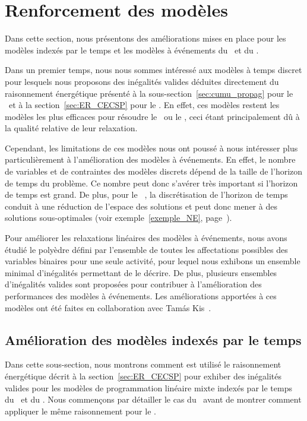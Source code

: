 \section{Renforcement des modèles}
\label{sec:amelioration_modele}
Dans cette section, nous présentons des améliorations mises en place
pour les modèles indexés par le temps et les modèles à événements du
\RCPSP~et du \CECSP. 

Dans un premier temps, nous nous sommes intéressé aux modèles à temps
discret pour lesquels nous proposons des inégalités valides déduites
directement du raisonnement énergétique présenté à la
sous-section~\ref{sec:cumu_propag} pour le \CUSP~et à la
section~\ref{sec:ER_CECSP} pour le \CECSP. En effet, ces modèles
restent les modèles les plus efficaces pour résoudre le \CECSP~ou le
\RCPSP, ceci étant principalement dû à la qualité relative de leur
relaxation.

Cependant, les limitations de ces modèles nous ont poussé à nous
intéresser plus particulièrement à l'amélioration des modèles à
événements. En effet, le nombre de variables et de contraintes des
modèles discrets dépend de la taille de l'horizon de temps du
problème. Ce nombre peut donc s'avérer très important si l'horizon de
temps est grand.  De plus, pour le \CECSP~, la discrétisation de
l'horizon de temps conduit à une réduction de l'espace des solutions
et peut donc mener à des solutions sous-optimales (voir
exemple~\ref{exemple_NE}, page~\pageref{exemple_NE}).

Pour améliorer les relaxations linéaires des modèles à événements, nous
avons étudié le polyèdre défini par l'ensemble de toutes les
affectations possibles des variables binaires pour une seule activité,
pour lequel nous exhibons un ensemble minimal d'inégalités permettant
de le décrire. De plus, plusieurs ensembles d'inégalités valides sont
proposées pour contribuer à l'amélioration des performances des
modèles à événements. Les améliorations apportées à ces modèles ont
été faites en collaboration avec Tam{\'a}s Kis~\cite{LAASreport}.
 
\subsection{Amélioration des modèles indexés par le temps}
\label{sec:ER_TI}

Dans cette sous-section, nous montrons comment est utilisé le
raisonnement énergétique décrit à la section~\ref{sec:ER_CECSP} pour
exhiber des inégalités valides pour les modèles de programmation
linéaire mixte indexés par le temps du \RCPSP~et du \CECSP. Nous
commençons par détailler le cas du \CECSP~avant de montrer comment
appliquer le même raisonnement pour le \RCPSP.

